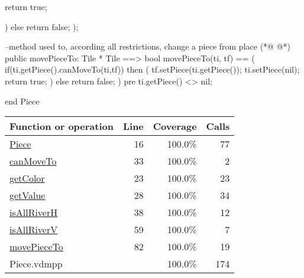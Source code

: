 \begin{vdmpp}[breaklines=true]
     return true;
      
    )
   else return false; 
 );
 
  --method used to, according all restrictions, change a piece from place
(*@
\label{movePieceTo:82}
@*)
  public movePieceTo: Tile * Tile ==> bool
    movePieceTo(ti, tf) == (
         if(ti.getPiece().canMoveTo(ti,tf))
           then (
            tf.setPiece(ti.getPiece());
            ti.setPiece(nil);
            return true;
            )
         else return false;     
    )
    pre ti.getPiece() <> nil;

end Piece
\end{vdmpp}
\bigskip
\begin{longtable}{|l|r|r|r|}
\hline
Function or operation & Line & Coverage & Calls \\
\hline
\hline
\hyperref[Piece:16]{Piece} & 16&100.0\% & 77 \\
\hline
\hyperref[canMoveTo:33]{canMoveTo} & 33&100.0\% & 2 \\
\hline
\hyperref[getColor:23]{getColor} & 23&100.0\% & 23 \\
\hline
\hyperref[getValue:28]{getValue} & 28&100.0\% & 34 \\
\hline
\hyperref[isAllRiverH:38]{isAllRiverH} & 38&100.0\% & 12 \\
\hline
\hyperref[isAllRiverV:59]{isAllRiverV} & 59&100.0\% & 7 \\
\hline
\hyperref[movePieceTo:82]{movePieceTo} & 82&100.0\% & 19 \\
\hline
\hline
Piece.vdmpp & & 100.0\% & 174 \\
\hline
\end{longtable}

